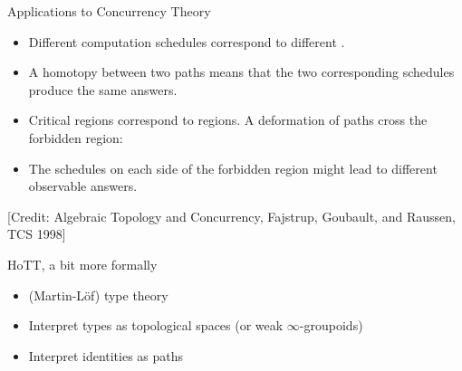 \documentclass[11pt]{beamer}
\newcommand{\red}[1]{{\color{red}{#1}}}
\begin{document}
\begin{frame}{Applications to Concurrency Theory}

\begin{itemize}

\vfill\item Different computation schedules correspond to different
\red{paths}.

\vfill\item A homotopy between two paths means that the two corresponding
schedules produce the same answers.

\vfill\item Critical regions correspond to \red{forbidden} regions. A
\red{continuous} deformation of paths \red{cannot} cross the forbidden
region:

\begin{center}
\end{center}

\vfill\item The schedules on each side of the forbidden region might lead to
different observable answers.

\end{itemize}

\vfill\footnotesize{[Credit: Algebraic Topology and Concurrency, Fajstrup,
    Goubault, and Raussen, TCS 1998]}
\end{frame}

\begin{frame}{HoTT, a bit more formally}

\begin{itemize}
\vfill\item (Martin-L\"of) type theory
\vfill\item Interpret types as topological spaces (or weak $\infty$-groupoids)
\vfill\item Interpret identities as paths
\end{itemize}

\vfill
\end{frame}
\end{document}
